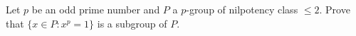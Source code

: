 
\begin{exercise}
\label{xca:class2_torsion}
Let $p$ be an odd prime number and 
$P$ a $p$-group of nilpotency class $\leq2$. 
Prove that $\{x\in P:x^p=1\}$ is a subgroup of $P$.
\end{exercise}

